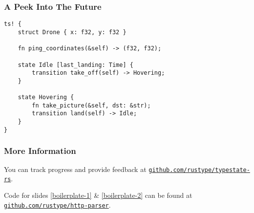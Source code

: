 \documentclass[notes]{beamer}
\begin{document}
\begin{frame}[fragile]
    \frametitle{A Peek Into The Future}
    \begin{lstlisting}
ts! {
    struct Drone { x: f32, y: f32 }

    fn ping_coordinates(&self) -> (f32, f32);

    state Idle [last_landing: Time] {
        transition take_off(self) -> Hovering;
    }

    state Hovering {
        fn take_picture(&self, dst: &str);
        transition land(self) -> Idle;
    }
}
    \end{lstlisting}

\end{frame}

\begin{frame}
    \frametitle{More Information}

    You can track progress and provide feedback at
    \href{https://github.com/rustype/typestate-rs}{\texttt{github.com/rustype/typestate-rs}}.

    Code for slides \autoref{boilerplate-1} \& \autoref{boilerplate-2} can be found at
    \href{https://github.com/rustype/http-parser}{\texttt{github.com/rustype/http-parser}}.

\end{frame}
\end{document}

